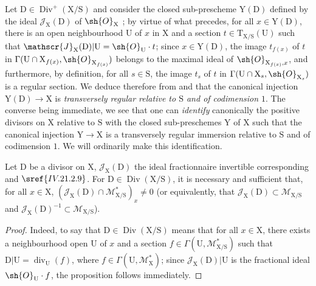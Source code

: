 \begin{env}[21.15.3bis]
\label{IV.21.15.3bis}
Let $\mathrm{D}\in\operatorname{Div}^+(\mathrm{X}/\mathrm{S})$ and consider the closed sub-prescheme $\mathrm{Y}(\mathrm{D})$ defined by the ideal $\mathscr{J}_{\mathrm{X}}(\mathrm{D})$ of $\sh{O}_{\mathrm{X}}$ ; by virtue of what precedes, for all $x\in\mathrm{Y}(\mathrm{D})$, there is an open neighbourhood $\mathrm{U}$ of $x$ in $\mathrm{X}$ and a section $t\in\mathrm{T}_{\mathrm{X}/\mathrm{S}}(\mathrm{U})$ such that $\mathscr{J}_{\mathrm{X}}(\mathrm{D})|\mathrm{U}=\sh{O}_{\mathrm{U}}\cdot t$; since $x\in\mathrm{Y}(\mathrm{D})$, the image $t_{f(x)}$ of $t$ in $\Gamma(\mathrm{U}\cap\mathrm{X}_{f(x)},\sh{O}_{\mathrm{X}_{f(x)}})$ belongs to the maximal ideal of $\sh{O}_{\mathrm{X}_{f(x)},x}$, and furthermore, by definition, for all $s\in\mathrm{S}$, the image $t_s$ of $t$ in $\Gamma(\mathrm{U}\cap\mathrm{X}_s,\sh{O}_{\mathrm{X}_s})$ is a regular section.
We deduce therefore from  and  that the canonical injection $\mathrm{Y}(\mathrm{D})\to\mathrm{X}$ is \emph{transversely regular relative to $\mathrm{S}$ and of codimension $1$}.
The converse being immediate, we see that one can \emph{identify} canonically the positive divisors on $\mathrm{X}$ relative to $\mathrm{S}$ with the closed sub-preschemes $\mathrm{Y}$ of $\mathrm{X}$ such that the canonical injection $\mathrm{Y}\to\mathrm{X}$ is a transversely regular immersion relative to $\mathrm{S}$ and of codimension $1$.
We will ordinarily make this identification.
\end{env}

\begin{proposition}[21.15.4]
\label{IV.21.15.4}
Let $\mathrm{D}$ be a divisor on $\mathrm{X}$, $\mathscr{J}_{\mathrm{X}}(\mathrm{D})$ the ideal fractionnaire invertible corresponding  and $\sref{IV.21.2.9}$.
For $\mathrm{D}\in\operatorname{Div}(\mathrm{X}/\mathrm{S})$, it is necessary and sufficient that, for all $x\in\mathrm{X}$, $(\mathscr{J}_{\mathrm{X}}(\mathrm{D})\cap\mathscr{M}_{\mathrm{X}/\mathrm{S}}^*)_x\neq 0$ (or equivalently, that $\mathscr{J}_{\mathrm{X}}(\mathrm{D})\subset\mathscr{M}_{\mathrm{X}/\mathrm{S}}$ and $\mathscr{J}_{\mathrm{X}}(\mathrm{D})^{-1}\subset\mathscr{M}_{\mathrm{X}/\mathrm{S}}$).
\end{proposition}

\begin{proof}
Indeed, to say that $\mathrm{D}\in\operatorname{Div}(\mathrm{X}/\mathrm{S})$ means that for all $x\in\mathrm{X}$, there exists a neighbourhood open $\mathrm{U}$ of $x$ and a section $f\in\Gamma(\mathrm{U},\mathscr{M}_{\mathrm{X}/\mathrm{S}}^*)$ such that $\mathrm{D}|\mathrm{U}=\operatorname{div}_{\mathrm{U}}(f)$, where $f\in\Gamma(\mathrm{U},\mathscr{M}_{\mathrm{X}}^*)$; since $\mathscr{J}_{\mathrm{X}}(\mathrm{D})|\mathrm{U}$ is the fractional ideal $\sh{O}_{\mathrm{U}}\cdot f$, the proposition follows immediately.
\end{proof}

